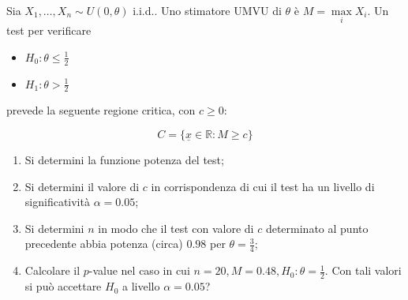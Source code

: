 \documentclass[hidelinks, 10pt]{report}
\begin{document}
\begin{ex}
Sia $ X_{1}, \dotsc, X_{n} \sim U(0, \theta) $ i.i.d.. Uno stimatore UMVU di $ \theta $ \`e $ M = \max\limits_{i} X_{i} $. Un test per verificare
\begin{itemize}
\item $ H_{0} : \theta \le \frac{1}{2} $
\item $ H_{1} : \theta > \frac{1}{2} $ 
\end{itemize} 
prevede la seguente regione critica, con $ c \ge 0 $:

\[ C = \{ \underline{x} \in \mathbb{R} : M \ge c \} \]

\begin{enumerate}
\item Si determini la funzione potenza del test;
\item Si determini il valore di $ c $ in corrispondenza di cui il test ha un livello di significativit\`a $ \alpha = 0.05 $;
\item Si determini $ n $ in modo che il test con valore di $ c $ determinato al punto precedente abbia potenza (circa) $ 0.98 $ per $ \theta = \frac{3}{4} $;
\item Calcolare il $ p $-value nel caso in cui $ n = 20, M = 0.48, H_{0} : \theta = \frac{1}{2} $. Con tali valori si pu\`o accettare $ H_{0} $ a livello $ \alpha = 0.05 $?
\end{enumerate}
\end{ex}
\end{document}
